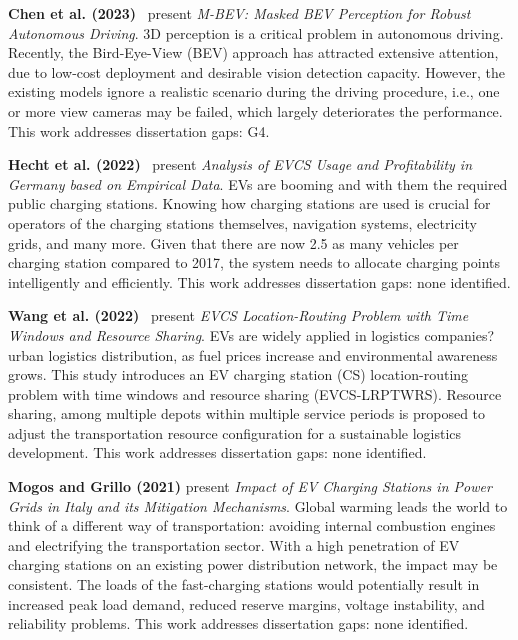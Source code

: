 \documentclass[letterpaper, 12pt, oneside, doublespacing]{Thesis}
\begin{document}
\noindent \textbf{Chen et al. (2023)}~\cite{m-bev_masked_2023} present \textit{M-BEV: Masked BEV Perception for Robust Autonomous Driving}. 3D perception is a critical problem in autonomous driving. Recently, the Bird-Eye-View (BEV) approach has attracted extensive attention, due to low-cost deployment and desirable vision detection capacity. However, the existing models ignore a realistic scenario during the driving procedure, i.e., one or more view cameras may be failed, which largely deteriorates the performance. This work addresses dissertation gaps: G4.



\noindent \textbf{Hecht et al. (2022)}~\cite{analysis_of_2022} present \textit{Analysis of EVCS Usage and Profitability in Germany based on Empirical Data}. EVs are booming and with them the required public charging stations. Knowing how charging stations are used is crucial for operators of the charging stations themselves, navigation systems, electricity grids, and many more. Given that there are now 2.5 as many vehicles per charging station compared to 2017, the system needs to allocate charging points intelligently and efficiently. This work addresses dissertation gaps: none identified.



\noindent \textbf{Wang et al. (2022)}~\cite{research_on_2022} present \textit{EVCS Location-Routing Problem with Time Windows and Resource Sharing}. EVs are widely applied in logistics companies? urban logistics distribution, as fuel prices increase and environmental awareness grows. This study introduces an EV charging station (CS) location-routing problem with time windows and resource sharing (EVCS-LRPTWRS). Resource sharing, among multiple depots within multiple service periods is proposed to adjust the transportation resource configuration for a sustainable logistics development. This work addresses dissertation gaps: none identified.



\noindent \textbf{Mogos and Grillo (2021)} present \textit{Impact of EV Charging Stations in Power Grids in Italy and its Mitigation Mechanisms}. Global warming leads the world to think of a different way of transportation: avoiding internal combustion engines and electrifying the transportation sector. With a high penetration of EV charging stations on an existing power distribution network, the impact may be consistent. The loads of the fast-charging stations would potentially result in increased peak load demand, reduced reserve margins, voltage instability, and reliability problems. This work addresses dissertation gaps: none identified.
\end{document}
